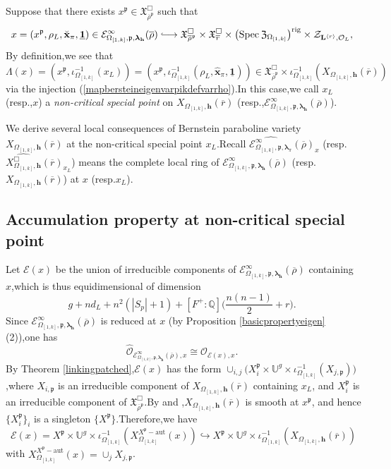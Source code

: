 \documentclass[SecEq,CM,GP]{degruyter-crelle} %
\theoremstyle{plain}
\newcommand{\hooklongrightarrow}{\lhook\joinrel\longrightarrow}
\newcommand{\bersteineigenvarpik}{{\mathcal{E}_{\omepik,\fp,\bm{\lambda}_\bh}^\infty(\overline{\rho})}}
\newcommand{\complocalbersteineigenvarpik}{{\widehat{\mathcal{E}_{\omepik,\fp,\bm{\lambda}_\pi}^\infty}(\overline{\rho})_x}}
\newcommand{\complocaldefvarrho}{{ \widehat{X^\Box_{\omepik,\mathbf{{h}}}}(\overline{r})_{x_L}}}
\newcommand{\defvar}{{ X_{\omepik,\mathbf{{h}}}(\overline{r})}}
\newcommand{\defvarrho}{{ X_{\omepik,\mathbf{{h}}}(\overline{r})}}
\newcommand{\lrr}{{\langle r\rangle}}
\newcommand{\omepik}{\Omega_{[1,k]}}
\newcommand{\rigch}{{\mathcal{Z}_{\bL^{\lrr},\mathcal{O}_L}}}
\newcommand{\sbanpik}{{\big(\mathrm{Spec}\hspace{2pt}\mathfrak{Z}_{\omepik}\big)^{\mathrm{rig}}}}
\newcommand{\xfpx}{X^{X^\fp-\mathrm{aut}}_{\omepik}(x)}
\newcommand{\BQ}{{\mathbb{Q}}}
\newcommand{\BU}{{\mathbb{U}}}
\newcommand{\bL}{{\mathbf{L}}}
\newcommand{\bx}{{\mathbf{x}}}
\newcommand{\bh}{{\mathbf{h}}}
\newcommand{\cE}{\mathcal E}
\newcommand{\cO}{\mathcal O}
\newcommand{\FX}{{\mathfrak{X}}}
\newcommand{\fp}{{\mathfrak{p}}}
\newcommand{\sL}{\mathcal L}
\begin{document}
Suppose that there exists $x^{\fp}\in \FX_{\overline{\rho}^{\fp}}^\Box$ such that
$$x=(x^{\fp}, \rho_L, \breve{\mathbf{{x}}}_\pi,\underline{\mathbf{1}})\in \bersteineigenvarpik \hooklongrightarrow \FX_{\overline{\rho}^{\fp}}^\Box\times \mathfrak{X}_{\overline{r}}^\Box \times \sbanpik\times \rigch,\;$$
By definition,\;we see that $$\Lambda(x)=(x^{\fp},\iota_{\omepik}^{-1}(x_L))=(x^{\fp},\iota_{\omepik}^{-1}(\rho_L,\widehat{\bx}_\pi,\mathbf{\underline{1}}))\in \FX_{\overline{\rho}^{\fp}}^\Box\times \iota_{\omepik}^{-1}(\defvar)$$ via the injection (\ref{mapbersteineigenvarpikdefvarrho}).\;In this case,\;we call $x_L$ (resp.,\;$x$) a \textit{non-critical special point} on $\defvarrho$ (resp.,\;$\bersteineigenvarpik$).\;


We derive several local consequences of Bernstein paraboline variety $\defvarrho$ at
the non-critical special point $x_L$.\;Recall $\complocalbersteineigenvarpik$ (resp.\;$\complocaldefvarrho$)
means the complete local ring of $\bersteineigenvarpik$ (resp.\;$\defvarrho$) at $x$ (resp.\;$x_L$).\;

\subsection{Accumulation property at non-critical special point}\label{ACC}
Let $\cE(x)$ be the union of  irreducible components of $\bersteineigenvarpik$ containing $x$,\;which is thus equidimensional of dimension \[g+nd_L+n^2(|S_p|+1)+[F^+:\BQ]\Big(\frac{n(n-1)}{2}+r\Big).\;\]Since $\bersteineigenvarpik$ is reduced at $x$ (by Proposition \ref{basicpropertyeigen} (2)),\;one has
\begin{equation}\label{OZlocal}
\widehat{\cO}_{\bersteineigenvarpik,x}\cong \widehat{\cO}_{\cE(x),x}.\;
\end{equation}
By Theorem \ref{linkingpatched},\;$\cE(x)$ has the form $\cup_{i,j} \big(X_i^{\fp}\times \BU^g \times \iota_{\omepik}^{-1}(X_{j,\fp})\big)$,\;where $X_{i,\fp}$ is an irreducible component of $\defvarrho$ containing $x_L$, and $X_i^{\fp}$ is an irreducible component of $\FX_{\overline{\rho}^{\fp}}^\Box$.\;By \cite[Theorem 3.3.8]{kisin2008potentially} and \cite[Lemma 2.5]{PATCHING2016},\;$\defvarrho$ is  smooth at $x^{\fp}$, and hence $\{X_i^{\fp}\}_i$ is a singleton $\{X^{\fp}\}$.\;Therefore,\;we have
\begin{equation}\label{OZfactor}
\cE(x)=X^{\fp} \times \BU^g \times \iota_{\omepik}^{-1}(\xfpx)\hookrightarrow X^{\fp} \times \BU^g \times \iota_{\omepik}^{-1}(\defvarrho)
\end{equation}
with $\xfpx=\cup_j X_{j,\fp}$.\;
\end{document}
